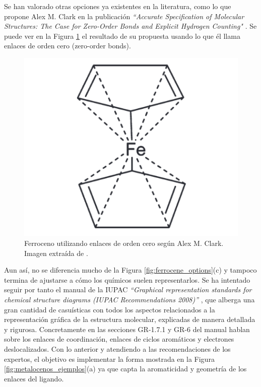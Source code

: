 Se han valorado otras opciones ya existentes en la literatura, como lo que propone Alex M. Clark en la publicación \textit{``Accurate Specification of Molecular Structures: The Case for Zero-Order Bonds and Explicit Hydrogen Counting"} \cite{zero_order}. Se puede ver en la Figura \ref{fig:zero_bond_ferrocene} el resultado de su propuesta usando lo que él llama enlaces de orden cero (zero-order bonds). 
\begin{figure}[h!]
    \centering
    \includegraphics[scale=0.4]{imagenes/diseno/dibujo/zero_bond_orders_ferrocene.png}
    \caption{Ferroceno utilizando enlaces de orden cero según Alex M. Clark. Imagen extraída de \cite{zero_order}.}
    \label{fig:zero_bond_ferrocene}
\end{figure}

Aun así, no se diferencia mucho de la Figura \ref{fig:ferrocene_options}(c) y tampoco termina de ajustarse a cómo los químicos suelen representarlos. Se ha intentado seguir por tanto el manual de la IUPAC \textit{``Graphical representation standards for chemical structure diagrams (IUPAC Recommendations 2008)''} \cite{iupac_manual}, que alberga una gran cantidad de casuísticas con todos los aspectos relacionados a la representación gráfica de la estructura molecular, explicadas de manera detallada y rigurosa. Concretamente en las secciones GR-1.7.1 y GR-6 del manual hablan sobre los enlaces de coordinación, enlaces de ciclos aromáticos y electrones deslocalizados. Con lo anterior y atendiendo a las recomendaciones de los expertos, el objetivo es implementar la forma mostrada en la Figura \ref{fig:metalocenos_ejemplos}(a) ya que capta la aromaticidad y geometría de los enlaces del ligando.


